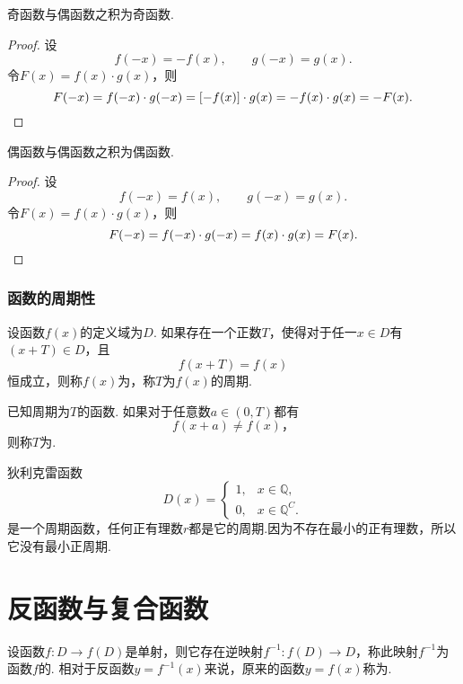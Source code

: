 \begin{property}
奇函数与偶函数之积为奇函数.
\begin{proof}
设\[
f(-x) = -f(x), \qquad g(-x) = g(x).
\]令\(F(x) = f(x) \cdot g(x)\)，则\[
F(-x) = f(-x) \cdot g(-x)
= [-f(x)] \cdot g(x)
= - f(x) \cdot g(x)
= - F(x).
\qedhere
\]
\end{proof}
\end{property}

\begin{property}
偶函数与偶函数之积为偶函数.
\begin{proof}
设\[
f(-x) = f(x), \qquad g(-x) = g(x).
\]令\(F(x) = f(x) \cdot g(x)\)，则\[
F(-x) = f(-x) \cdot g(-x) = f(x) \cdot g(x) = F(x).
\qedhere
\]
\end{proof}
\end{property}

\subsubsection{函数的周期性}
\begin{definition}
设函数\(f(x)\)的定义域为\(D\).
如果存在一个正数\(T\)，使得对于任一\(x \in D\)有\((x + T) \in D\)，且\[
f(x+ T) = f(x)
\]恒成立，则称\(f(x)\)为，称\(T\)为\(f(x)\)的周期.

已知周期为\(T\)的函数.
如果对于任意数\(a \in (0,T)\)都有\[
f(x + a) \neq f(x)，%
\]则称\(T\)为.
\end{definition}

\begin{example}
狄利克雷函数\[
D(x) = \left\{ \begin{array}{ll}
1, & x \in \mathbb{Q}, \\
0, & x \in \mathbb{Q}^C.
\end{array} \right.
\]是一个周期函数，任何正有理数\(r\)都是它的周期.因为不存在最小的正有理数，所以它没有最小正周期.
\end{example}

\section{反函数与复合函数}
\begin{definition}[反函数]
设函数\(f\colon D \to f(D)\)是单射，则它存在逆映射\(f^{-1}: f(D) \to D\)，称此映射\(f^{-1}\)为函数\(f\)的.
相对于反函数\(y=f^{-1}(x)\)来说，原来的函数\(y=f(x)\)称为.
\end{definition}

